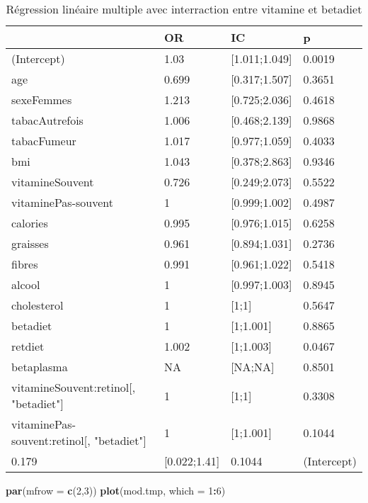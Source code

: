 \documentclass[]{article}
\newenvironment{Shaded}{\begin{snugshade}}{\end{snugshade}}
\newcommand{\KeywordTok}[1]{\textcolor[rgb]{0.13,0.29,0.53}{\textbf{#1}}}
\newcommand{\DataTypeTok}[1]{\textcolor[rgb]{0.13,0.29,0.53}{#1}}
\newcommand{\DecValTok}[1]{\textcolor[rgb]{0.00,0.00,0.81}{#1}}
\newcommand{\OperatorTok}[1]{\textcolor[rgb]{0.81,0.36,0.00}{\textbf{#1}}}
\newcommand{\NormalTok}[1]{#1}
\begin{document}
\begin{table}

\caption{\label{tab:unnamed-chunk-87}Régression linéaire multiple avec interraction entre vitamine et betadiet}
\centering
\begin{tabular}[t]{l|l|l|l}
\hline
  & OR & IC & p\\
\hline
\rowcolor[HTML]{BBD2E1}  (Intercept) & 1.03 & [1.011;1.049] & 0.0019\\
\hline
age & 0.699 & [0.317;1.507] & 0.3651\\
\hline
\rowcolor[HTML]{BBD2E1}  sexeFemmes & 1.213 & [0.725;2.036] & 0.4618\\
\hline
tabacAutrefois & 1.006 & [0.468;2.139] & 0.9868\\
\hline
\rowcolor[HTML]{BBD2E1}  tabacFumeur & 1.017 & [0.977;1.059] & 0.4033\\
\hline
bmi & 1.043 & [0.378;2.863] & 0.9346\\
\hline
\rowcolor[HTML]{BBD2E1}  vitamineSouvent & 0.726 & [0.249;2.073] & 0.5522\\
\hline
vitaminePas-souvent & 1 & [0.999;1.002] & 0.4987\\
\hline
\rowcolor[HTML]{BBD2E1}  calories & 0.995 & [0.976;1.015] & 0.6258\\
\hline
graisses & 0.961 & [0.894;1.031] & 0.2736\\
\hline
\rowcolor[HTML]{BBD2E1}  fibres & 0.991 & [0.961;1.022] & 0.5418\\
\hline
alcool & 1 & [0.997;1.003] & 0.8945\\
\hline
\rowcolor[HTML]{BBD2E1}  cholesterol & 1 & [1;1] & 0.5647\\
\hline
betadiet & 1 & [1;1.001] & 0.8865\\
\hline
\rowcolor[HTML]{BBD2E1}  retdiet & 1.002 & [1;1.003] & 0.0467\\
\hline
betaplasma & NA & [NA;NA] & 0.8501\\
\hline
\rowcolor[HTML]{BBD2E1}  vitamineSouvent:retinol[, "betadiet"] & 1 & [1;1] & 0.3308\\
\hline
vitaminePas-souvent:retinol[, "betadiet"] & 1 & [1;1.001] & 0.1044\\
\hline
\rowcolor[HTML]{BBD2E1}  0.179 & [0.022;1.41] & 0.1044 & (Intercept)\\
\hline
\end{tabular}
\end{table}

\begin{Shaded}
\begin{Highlighting}[]
\KeywordTok{par}\NormalTok{(}\DataTypeTok{mfrow =} \KeywordTok{c}\NormalTok{(}\DecValTok{2}\NormalTok{,}\DecValTok{3}\NormalTok{))}
\KeywordTok{plot}\NormalTok{(mod.tmp, }\DataTypeTok{which =} \DecValTok{1}\OperatorTok{:}\DecValTok{6}\NormalTok{)}
\end{Highlighting}
\end{Shaded}
\end{document}
